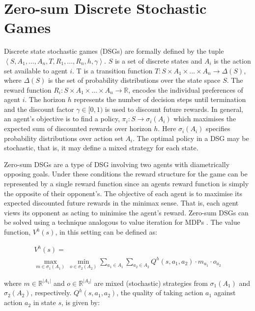 \section{Zero-sum Discrete Stochastic Games}
\label{sec:dsg}
Discrete state stochastic games (DSGs) are formally defined by the tuple
$ \left\langle S, A_{1}, \ldots, A_{n}, T, R_{1}, \ldots, R_{n}, h, \gamma\right\rangle$.
$S$ is a set of discrete states and $A_i$ is the action set available to agent 
$i$. T is a transition function $T : S \times A_1 \times \ldots \times A_n \rightarrow \Delta(S)$, 
where $\Delta(S)$ is the set of probability distributions over the state space $S$. 
The reward function $R_i : S \times A_1 \times \ldots \times A_n \rightarrow \mathbb{R}$,
encodes the individual preferences of agent $i$. The horizon $h$ represents the 
number of decision steps until termination and the discount factor $\gamma \in [0, 1)$ 
is used to discount future rewards. In general, an agent's objective is 
to find a policy, $\pi_i : S \rightarrow \sigma_i(A_i)$ which maximises the expected 
sum of discounted rewards over horizon $h$. Here $\sigma_i(A_i)$ specifies
probability distributions over action set $A_i$. The optimal policy in a 
DSG may be stochastic, that is, it may define a mixed strategy for each state. 

Zero-sum DSGs are a type of DSG involving two agents with diametrically
opposing goals. Under these conditions the reward structure for the 
game can be represented by a single reward function since an agents
reward function is simply the opposite of their opponent's. The objective
of each agent is to maximise its expected discounted future rewards 
in the minimax sense. That is, each agent views its opponent as
acting to minimise the agent's reward. Zero-sum DSGs can be solved 
using a technique analogous to value iteration for MDPs \cite{Littman_ICML_1994}. 
The value function, {\small $ V^{h}(s) $}, in this setting can be defined as:

{\small
\abovedisplayskip=0pt
\belowdisplayskip=0pt
\begin{align}
\label{eq:dsgvfunc}
  & V^{h}(s) = \nonumber \\
  & \max_{m \in \sigma_1(A_1)} \hspace{2pt} \min_{o \in \sigma_2(A_2)} \sum_{a_1 \in A_1} \sum_{a_2 \in A_2} Q^{h}(s, a_1, a_2) \cdot m_{a_{1}} \cdot o_{a_{2}} &
\end{align}
}%

where {\small $m \in \mathbb{R}^{|A_1|}$} and {\small $o \in \mathbb{R}^{|A_2|}$}
are mixed (stochastic) strategies from {\small $\sigma_1(A_1) $} and {\small $\sigma_2(A_2) $}, 
respectively. {\small $Q^{h}(s, a_1, a_2)$}, the quality of taking action $a_1$ against action $a_2$ in state $s$,
is given by:

